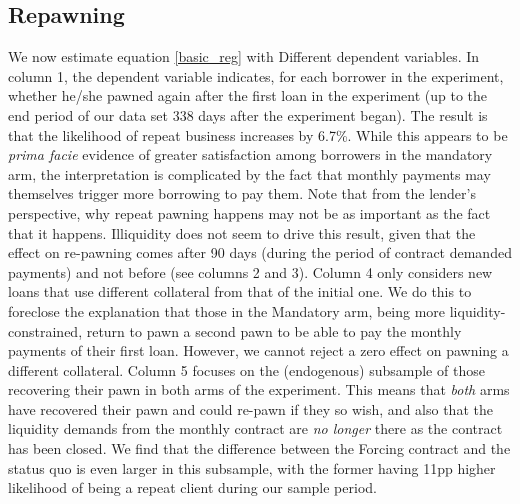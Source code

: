 \begin{appendix}
\newpage 

\normalsize

\normalsize


\subsection{Repawning}

We now estimate equation \ref{basic_reg} with Different dependent variables.  In column 1, the dependent variable indicates, for each borrower in the experiment, whether he/she pawned again after the first loan in the
experiment (up to the end period of our data set 338 days after the experiment began). The result is that the likelihood of repeat business increases by 6.7\%.  While this appears to be \emph{prima facie} evidence of greater satisfaction among borrowers in the mandatory arm, the interpretation is complicated by the fact that monthly payments may themselves trigger more borrowing to pay them. Note that from the lender's perspective, why repeat pawning happens may not be as important as the fact that it happens. Illiquidity does not seem to drive this result, given that the effect on re-pawning comes after 90 days (during the period of contract demanded payments) and not before  (see columns 2 and 3). Column 4 only considers new loans that use different collateral from that of the initial one. We do this to foreclose the explanation that those in the Mandatory arm, being more liquidity-constrained, return to pawn a second pawn to be able to pay the monthly payments of their first loan. However, we cannot reject a zero effect on pawning a different collateral. Column 5 focuses on the (endogenous) subsample of those recovering their pawn in both arms of the experiment. This means that \textit{both} arms have recovered their pawn and could re-pawn if they so wish, and also that the liquidity demands from the monthly contract are \textit{no longer} there as the contract has been closed.  We find that the difference between the Forcing contract and the status quo is even larger in this subsample, with the former having 11pp higher likelihood of being a repeat client during our sample period.

\newpage


\end{appendix}
